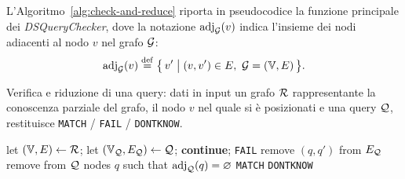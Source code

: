 L'Algoritmo~\ref{alg:check-and-reduce} riporta in pseudocodice
la funzione principale dei \emph{DSQueryChecker}, dove la
notazione $\mathrm{adj}_{\mathcal{G}}(v)$ indica l'insieme dei nodi
adiacenti al nodo $v$ nel grafo $\mathcal{G}$:
\[
\adj{v}{\cG} \defeq \bigl\{\, v' \bigm| (v, v') \in E,
\ \cG = (\Vset, E) \,\bigr\}.
\]

\begin{algorithm}
  \caption{Verifica e riduzione di una query: dati in input
    un grafo $\mathcal{R}$ rappresentante la conoscenza parziale del grafo,
    il nodo $v$ nel quale si è posizionati e
    una query $\mathcal{Q}$, restituisce \texttt{MATCH} / \texttt{FAIL}
    / \texttt{DONTKNOW}.
  }
\label{alg:check-and-reduce}
\begin{algorithmic}[2]
  \State let $(\mathbb{V}, E) \gets \mathcal{R}$;
  \State let $(\mathbb{V}_{\mathcal{Q}}, E_{\mathcal{Q}}) \gets \mathcal{Q}$;
  \State {}
     \textbf{continue}; \EndIf
       \State \Return \texttt{FAIL}
    \EndIf
      \State remove $(q, q')$ from $E_{\mathcal{Q}}$
      \EndIf
    \EndFor
  \EndFor
  \State remove from $\mathcal{Q}$ nodes $q$ such that
  $\mathrm{adj}_{\mathcal{Q}}(q) = \varnothing$
  \If {$\Vset_\cQ = \varnothing$}
    \State \Return \texttt{MATCH}
  \Else
    \State \Return \texttt{DONTKNOW}
  \EndIf
\EndFunction
\end{algorithmic}
\end{algorithm}

